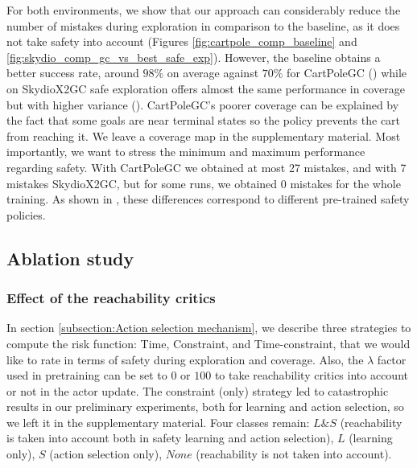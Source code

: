 For both environments, we show that our approach can considerably reduce the number of mistakes 
during exploration in comparison to the baseline, as it does not take safety into account
(Figures \ref{fig:cartpole_comp_baseline} and \ref{fig:skydio_comp_gc_vs_best_safe_exp}). 
However, the baseline obtains a better success rate, around $98\%$ on average against $70\%$ 
for CartPoleGC () 
while on SkydioX2GC safe exploration offers almost the same performance in coverage but with higher
variance (). 
CartPoleGC's poorer coverage can be explained by the fact that some goals are near terminal states
so the policy prevents the cart from reaching it. We leave a coverage map in the supplementary material.
Most importantly, we want to stress the minimum and maximum performance regarding safety.
With CartPoleGC we obtained at most 27 mistakes, and with 7 mistakes SkydioX2GC, but for some runs,
we obtained 0 mistakes for the whole training.
As shown in , these differences 
correspond to different pre-trained safety policies.

\subsection{Ablation study}

\subsubsection{Effect of the reachability critics}
\label{subsec:ablation_dist}
In section \ref{subsection:Action selection mechanism}, we describe three strategies to compute 
the risk function: Time, Constraint, and Time-constraint, that we would like to rate in terms of safety during exploration and coverage. Also, the $\lambda$ factor used in pretraining can be set to $0$ or
$100$ to take reachability critics into account or not in the actor update. 
The constraint (only) strategy led to catastrophic results 
in our preliminary experiments, both for learning and action selection, 
so we left it in the supplementary material. Four classes remain: $L\&S$ (reachability is taken into account both in safety learning and action selection), $L$ (learning only), $S$ (action selection only), $None$ (reachability is not taken into account).

